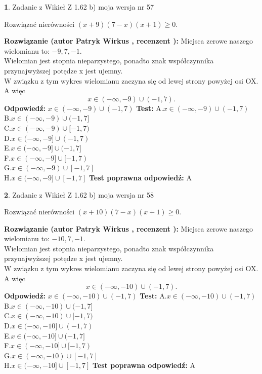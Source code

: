 \documentclass[12pt, a4paper]{article}
\theoremstyle{definition} %
\newtheorem{zad}{}
\newcommand{\zadStart}[1]{\begin{zad}#1\newline}
\newcommand{\zadStop}{\end{zad}}
\newcommand{\rozwStart}[2]{\noindent \textbf{Rozwiązanie (autor #1 , recenzent #2): }\newline}
\newcommand{\rozwStop}{\newline}
\newcommand{\odpStart}{\noindent \textbf{Odpowiedź:}\newline}
\newcommand{\odpStop}{\newline}
\newcommand{\testStart}{\noindent \textbf{Test:}\newline}
\newcommand{\testStop}{\newline}
\newcommand{\kluczStart}{\noindent \textbf{Test poprawna odpowiedź:}\newline}
\newcommand{\kluczStop}{\newline}
\begin{document}
\zadStart{Zadanie z Wikieł Z 1.62 b) moja wersja nr 57}

Rozwiązać nierówności $(x+9)(7-x)(x+1)\ge0$.
\zadStop
\rozwStart{Patryk Wirkus}{}
Miejsca zerowe naszego wielomianu to: $-9, 7, -1$.\\
Wielomian jest stopnia nieparzystego, ponadto znak współczynnika przy\linebreak najwyższej potędze x jest ujemny.\\ W związku z tym wykres wielomianu zaczyna się od lewej strony powyżej osi OX. A więc $$x \in (-\infty,-9) \cup (-1,7).$$
\rozwStop
\odpStart
$x \in (-\infty,-9) \cup (-1,7)$
\odpStop
\testStart
A.$x \in (-\infty,-9) \cup (-1,7)$\\
B.$x \in (-\infty,-9) \cup (-1,7]$\\
C.$x \in (-\infty,-9) \cup [-1,7)$\\
D.$x \in (-\infty,-9] \cup (-1,7)$\\
E.$x \in (-\infty,-9] \cup (-1,7]$\\
F.$x \in (-\infty,-9] \cup [-1,7)$\\
G.$x \in (-\infty,-9) \cup [-1,7]$\\
H.$x \in (-\infty,-9] \cup [-1,7]$
\testStop
\kluczStart
A
\kluczStop



\zadStart{Zadanie z Wikieł Z 1.62 b) moja wersja nr 58}

Rozwiązać nierówności $(x+10)(7-x)(x+1)\ge0$.
\zadStop
\rozwStart{Patryk Wirkus}{}
Miejsca zerowe naszego wielomianu to: $-10, 7, -1$.\\
Wielomian jest stopnia nieparzystego, ponadto znak współczynnika przy\linebreak najwyższej potędze x jest ujemny.\\ W związku z tym wykres wielomianu zaczyna się od lewej strony powyżej osi OX. A więc $$x \in (-\infty,-10) \cup (-1,7).$$
\rozwStop
\odpStart
$x \in (-\infty,-10) \cup (-1,7)$
\odpStop
\testStart
A.$x \in (-\infty,-10) \cup (-1,7)$\\
B.$x \in (-\infty,-10) \cup (-1,7]$\\
C.$x \in (-\infty,-10) \cup [-1,7)$\\
D.$x \in (-\infty,-10] \cup (-1,7)$\\
E.$x \in (-\infty,-10] \cup (-1,7]$\\
F.$x \in (-\infty,-10] \cup [-1,7)$\\
G.$x \in (-\infty,-10) \cup [-1,7]$\\
H.$x \in (-\infty,-10] \cup [-1,7]$
\testStop
\kluczStart
A
\kluczStop
\end{document}

